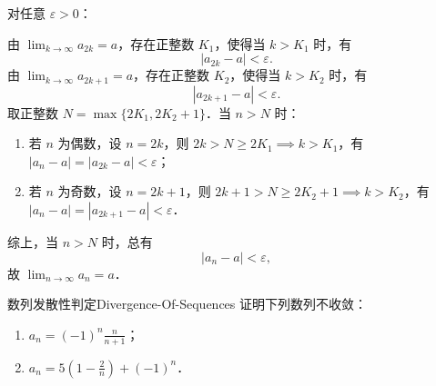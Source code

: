 \begin{myproof}
    对任意 $\varepsilon > 0$：

    由 $\lim_{k\to\infty} a_{2k} = a$，存在正整数 $K_1$，使得当 $k > K_1$ 时，有
    \begin{equation}
        |a_{2k} - a| < \varepsilon.
    \end{equation}
    由 $\lim_{k\to\infty} a_{2k+1} = a$，存在正整数 $K_2$，使得当 $k > K_2$ 时，有
    \begin{equation}
        |a_{2k+1} - a| < \varepsilon.
    \end{equation}
    取正整数 $N = \max\{2K_1, 2K_2 + 1\}$．当 $n > N$ 时：
    \begin{enumerate}
        \item 若 $n$ 为偶数，设 $n = 2k$，则 $2k > N \geqslant 2K_1 \implies k > K_1$，有 $|a_n - a| = |a_{2k} - a| < \varepsilon$；
        \item 若 $n$ 为奇数，设 $n = 2k + 1$，则 $2k + 1 > N \geqslant 2K_2 + 1 \implies k > K_2$，有 $|a_n - a| = |a_{2k+1} - a| < \varepsilon$．
    \end{enumerate}
    综上，当 $n > N$ 时，总有
    \begin{equation}
        |a_n - a| < \varepsilon,
    \end{equation}
    故 $\lim_{n\to\infty} a_n = a$．
\end{myproof}

\begin{problem}{数列发散性判定}{Divergence-Of-Sequences}
    证明下列数列不收敛：
    \begin{enumerate}
        \item $a_n = (-1)^n \frac{n}{n + 1}$；
        \item $a_n = 5\left( 1 - \frac{2}{n} \right) + (-1)^n$．
    \end{enumerate}
\end{problem}

